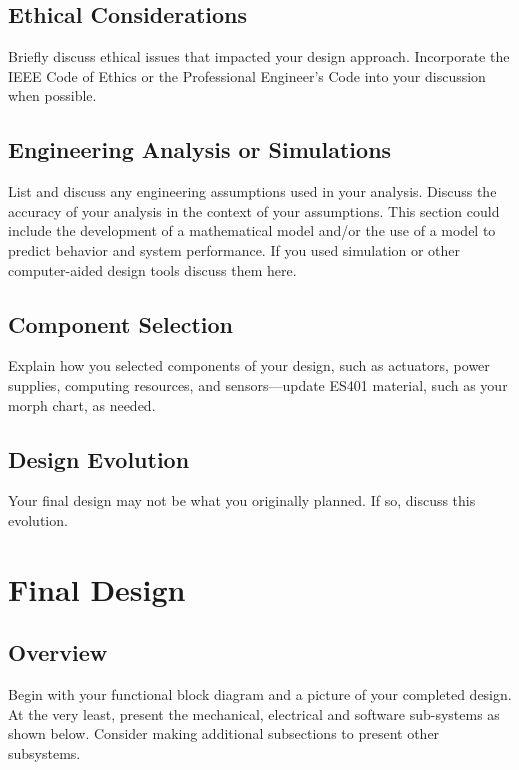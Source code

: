\documentclass{wsecapstone}
\begin{document}
\subsection{Ethical Considerations}
Briefly discuss ethical issues that impacted your design approach.  Incorporate the IEEE Code of Ethics or the Professional Engineer’s Code into your discussion when possible. 

\subsection{Engineering Analysis or Simulations}
List and discuss any engineering assumptions used in your analysis.  Discuss the accuracy of your analysis in the context of your assumptions.
This section could include the development of a mathematical model and/or the use of a model to predict behavior and system performance.  If you used simulation or other computer-aided design tools discuss them here.
 
\subsection{Component Selection}
Explain how you selected components of your design, such as actuators, power supplies, computing resources, and sensors—update ES401 material, such as your morph chart, as needed.  

\subsection{Design Evolution}
Your final design may not be what you originally planned. If so, discuss this evolution.





\section{Final Design}

\subsection{Overview}
Begin with your functional block diagram and a picture of your completed design.   At the very least, present the mechanical, electrical and software sub-systems as shown below.  Consider making additional subsections to present other subsystems.   
\end{document}
